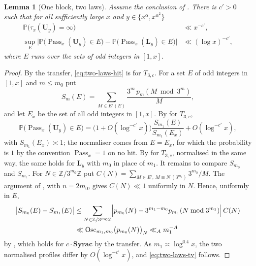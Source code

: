 \documentclass[12pt]{amsart}
\newtheorem{lemma}{Lemma}
\theoremstyle{definition}
\theoremstyle{remark}
\begin{document}
\begin{lemma}[One block, two laws]
\label{lem:two-laws}
Assume the conclusion of \cite[Section~6]{Allikvere_2026}. There is $c'>0$ such that for all sufficiently large $x$ and $y\in\{x^\alpha,x^{\alpha^2}\}$
\begin{align}
 \mathbb P\bigl(\tau_x(\mathbf U_y)=\infty\bigr)&\ll x^{-c'},\label{eq:two-laws-hit}\\
 \sup_{E}\bigl|\mathbb P\bigl(\operatorname{Pass}_x(\mathbf U_y)\in E\bigr)-\mathbb P\bigl(\operatorname{Pass}_x(\mathbf L_y)\in E\bigr)\bigr|&\ll(\log x)^{-c'},\label{eq:two-laws-tv}
\end{align}
where $E$ runs over the sets of odd integers in $[1,x]$.
\end{lemma}

\begin{proof}
By the transfer, \eqref{eq:two-laws-hit} is \cite[(D.1)]{Allikvere_2026} for $T_{3,c}$. For a set $E$ of odd integers in $[1,x]$ and $m\le m_0$ put
\[
 S_m(E)=\sum_{M\in E'(E)}\frac{3^m\,p_m(M\bmod 3^m)}{M},
\]
and let $E_x$ be the set of all odd integers in $[1,x]$. By \cite[Section~6.4]{Allikvere_2026} for $T_{3,c}$,
\[
 \mathbb P\bigl(\operatorname{Pass}_x(\mathbf U_y)\in E\bigr)=\bigl(1+O(\log^{-c'}x)\bigr)\frac{S_{m_1}(E)}{S_{m_1}(E_x)}+O(\log^{-c'}x),
\]
with $S_{m_1}(E_x)\asymp1$; the normaliser comes from $E=E_x$, for which the probability is $1$ by the convention $\operatorname{Pass}_x=1$ on no hit. By \cite[(5.7), (5.20), (5.21)]{Tao_2022} for $T_{3,c}$, normalised in the same way, the same holds for $\mathbf L_y$ with $m_0$ in place of $m_1$. It remains to compare $S_{m_0}$ and $S_{m_1}$. For $N\in\mathbb Z/3^{m_0}\mathbb Z$ put $C(N)=\sum_{M\in E',\,M\equiv N\ (3^{m_0})}3^{m_0}/M$. The argument of \cite[Step~3 in the proof of Proposition~3.5]{GGM_2025}, with $n=2m_0$, gives $C(N)\ll1$ uniformly in $N$. Hence, uniformly in $E$,
\[
 \begin{aligned}
 \bigl|S_{m_0}(E)-S_{m_1}(E)\bigr|
 &\le\sum_{N\in\mathbb Z/3^{m_0}\mathbb Z}\Bigl|p_{m_0}(N)-3^{m_1-m_0}p_{m_1}(N\bmod3^{m_1})\Bigr|\,C(N)\\
 &\ll\operatorname{Osc}_{m_1,m_0}\bigl(p_{m_0}(N)\bigr)_N\ll_Am_1^{-A}
 \end{aligned}
\]
by \cite[Proposition~1.14]{Tao_2022}, which holds for $c\cdot\mathbf{Syrac}$ by the transfer. As $m_1\asymp\log^{0.4}x$, the two normalised profiles differ by $O(\log^{-c'}x)$, and \eqref{eq:two-laws-tv} follows.
\end{proof}
\end{document}
